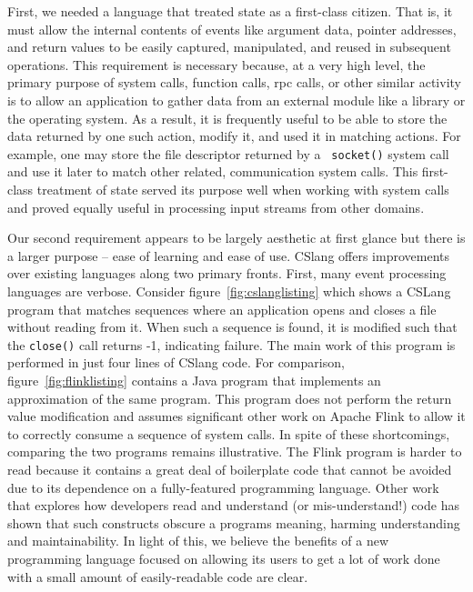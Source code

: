 First, we needed a language that treated state as a first-class citizen.
That is, it must allow the internal contents of events like argument data,
pointer addresses, and return values to be easily captured, manipulated, and
reused in subsequent operations.
This requirement is necessary because,
at a very high level,
the primary purpose of system calls,
function calls,
rpc calls,
or other similar activity
is to allow an application
to gather data from an external module like a library or the operating
system.
As a result, it is frequently useful to be able to store the data returned by
one such action, modify it, and used it in matching actions.
For example, one may store the file descriptor returned by a {\tt
socket()} system call and use it later to match other related,
communication system calls.
This first-class treatment of state served its
purpose well when working with system calls and proved equally useful in
processing input streams from other domains.





Our second requirement appears to be largely aesthetic at first glance
but there is a
larger purpose -- ease of learning and ease of use.  CSlang offers
improvements over existing languages along two primary fronts.
First, many event processing languages are verbose.
Consider figure~\ref{fig:cslanglisting}  which shows a
CSLang program that matches sequences where an application opens and closes
a file without reading from it.  When such a sequence is found, it is
modified such that the {\tt close()} call returns -1, indicating failure.
The main work of this program is performed in just four lines of CSlang
code.  For comparison, figure~\ref{fig:flinklisting} contains a Java program that
implements an approximation of the same program.  This program does not
perform the return value modification and assumes significant other work
on Apache Flink to allow it to correctly consume a sequence of system calls.
In spite of these shortcomings, comparing the two programs remains
illustrative.  The Flink program is harder to read because it contains a
great deal of boilerplate code
that cannot be avoided due to its dependence on a fully-featured
programming language.  Other work that explores how developers read and
understand (or mis-understand!) code has shown that such constructs obscure
a programs meaning, harming understanding and maintainability.
In light of this, we believe the benefits of a
new programming language
focused on allowing its users to get a lot of work done
with a small amount of easily-readable code are clear.

